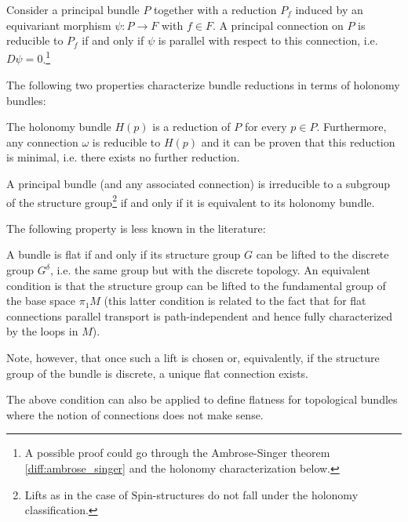     \begin{property}\label{diff:connection_reducibility}
        Consider a principal bundle $P$ together with a reduction $P_f$ induced by an equivariant morphism $\psi:P\rightarrow F$ with $f\in F$. A principal connection on $P$ is reducible to $P_f$ if and only if $\psi$ is parallel with respect to this connection, i.e. $D\psi = 0$.\footnote{A possible proof could go through the Ambrose-Singer theorem \ref{diff:ambrose_singer} and the holonomy characterization below.}
    \end{property}

    The following two properties characterize bundle reductions in terms of holonomy bundles:
    \begin{property}
        The holonomy bundle $H(p)$ is a reduction of $P$ for every $p\in P$. Furthermore, any connection $\omega$ is reducible to $H(p)$ and it can be proven that this reduction is minimal, i.e. there exists no further reduction.
    \end{property}
    \begin{result}\label{diff:reducible_holonomy}
        A principal bundle (and any associated connection) is irreducible to a subgroup of the structure group\footnote{Lifts as in the case of $\text{Spin}$-structures do not fall under the holonomy classification.} if and only if it is equivalent to its holonomy bundle.
    \end{result}

    The following property is less known in the literature:
    \begin{property}\label{diff:flat_connection_cohomology}
        A bundle is flat if and only if its structure group $G$ can be lifted to the discrete group $G^\delta$, i.e. the same group but with the discrete topology. An equivalent condition is that the structure group can be lifted to the fundamental group of the base space $\pi_1M$ (this latter condition is related to the fact that for flat connections parallel transport is path-independent and hence fully characterized by the loops in $M$).

        Note, however, that once such a lift is chosen or, equivalently, if the structure group of the bundle is discrete, a unique flat connection exists.
    \end{property}
    \begin{remark}
        The above condition can also be applied to define flatness for topological bundles where the notion of connections does not make sense.
    \end{remark}

